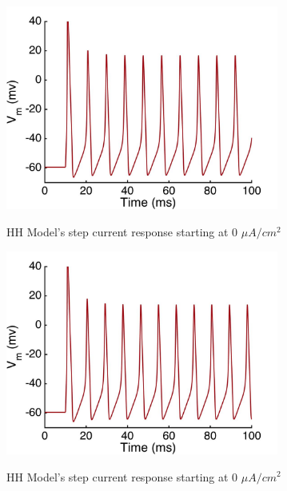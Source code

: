 \documentclass{beamer}
\begin{document}
\begin{frame}
  \begin{figure}
    \centering
    \includegraphics[width = 0.8\textwidth]{./images/current_0_45.jpg}

    HH Model's step current response starting at 0 $\mu A/cm^2$
  \end{figure}
\end{frame}


\begin{frame}
  \begin{figure}
    \centering
    \includegraphics[width = 0.8\textwidth]{./images/current_0_50.jpg}

    HH Model's step current response starting at 0 $\mu A/cm^2$
  \end{figure}
\end{frame}
\end{document}
